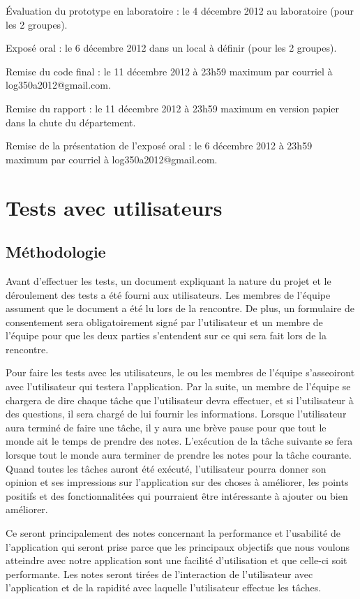 \documentclass[letterpaper, oneside, 12pt, these, creativecommons]{thETS}
\begin{document}
Évaluation du prototype en laboratoire  : le 4 décembre 2012 au laboratoire (pour les 2 groupes).

Exposé oral  : le 6 décembre 2012 dans un local à définir (pour les 2 groupes).

Remise du code final : le 11 décembre 2012 à 23h59 maximum par courriel à log350a2012@gmail.com.

Remise du rapport :  le 11 décembre 2012 à 23h59 maximum en version papier dans la chute du département.

Remise de la présentation de l’exposé oral : le 6 décembre 2012 à 23h59 maximum par courriel à log350a2012@gmail.com.

\chapter{Tests avec utilisateurs}

\section{Méthodologie}

Avant d'effectuer les tests, un document expliquant la nature du projet et le déroulement des tests a été fourni aux utilisateurs. Les membres de l'équipe assument que le document a été lu lors de la rencontre. De plus, un formulaire de consentement sera obligatoirement signé par l'utilisateur et un membre de l'équipe pour que les deux parties s'entendent sur ce qui sera fait lors de la rencontre.

Pour faire les tests avec les utilisateurs, le ou les membres de l'équipe s'asseoiront avec l'utilisateur qui testera l'application. Par la suite, un membre de l'équipe se chargera de dire chaque tâche que l'utilisateur devra effectuer, et si l'utilisateur à des questions, il sera chargé de lui fournir les informations. Lorsque l'utilisateur aura terminé de faire une tâche, il y aura une brève pause pour que tout le monde ait le temps de prendre des notes. L'exécution de la tâche suivante se fera lorsque tout le monde aura terminer de prendre les notes pour la tâche courante. Quand toutes les tâches auront été exécuté, l'utilisateur pourra donner son opinion et ses impressions sur l'application sur des choses à améliorer, les points positifs et des fonctionnalitées qui pourraient être intéressante à ajouter ou bien améliorer.

Ce seront principalement des notes concernant la performance et l'usabilité de l'application qui seront prise parce que les principaux objectifs que nous voulons atteindre avec notre application sont une facilité d'utilisation et que celle-ci soit performante. Les notes seront tirées de l'interaction de l'utilisateur avec l'application et de la rapidité avec laquelle l'utilisateur effectue les tâches.
\end{document}
